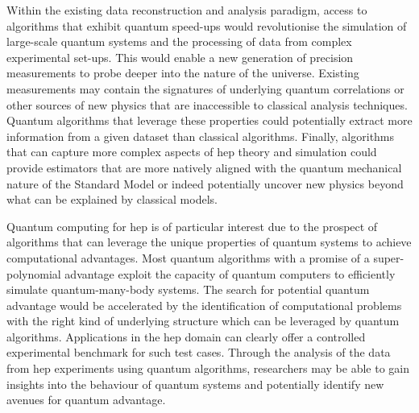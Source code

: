 Within the existing data reconstruction and analysis paradigm, access to algorithms that exhibit quantum speed-ups would revolutionise the simulation of large-scale quantum systems and the processing of data from complex experimental set-ups. This would enable a new generation of precision measurements to probe deeper into the nature of the universe. Existing measurements may contain the signatures of underlying quantum correlations or other sources of new physics that are inaccessible to classical analysis techniques. Quantum algorithms that leverage these properties could potentially extract more information from a given dataset than classical algorithms. Finally, algorithms that can capture more complex aspects of \gls{hep} theory and simulation could provide estimators that are more natively aligned with the quantum mechanical nature of the Standard Model or indeed potentially uncover new physics beyond what can be explained by classical models.

Quantum computing for \gls{hep} is of particular interest due to the prospect of algorithms that can leverage the unique properties of quantum systems to achieve computational advantages. Most quantum algorithms with a promise of a super-polynomial advantage exploit the capacity of quantum computers to efficiently simulate quantum-many-body systems. The search for potential quantum advantage would be accelerated by the identification of computational problems with the right kind of underlying structure which can be leveraged by quantum algorithms. Applications in the \gls{hep} domain can clearly offer a controlled experimental benchmark for such test cases. Through the analysis of the data from \gls{hep} experiments using quantum algorithms, researchers may be able to gain insights into the behaviour of quantum systems and potentially identify new avenues for quantum advantage.

